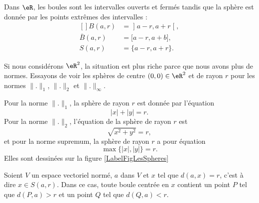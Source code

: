 \begin{example}
	Dans $\eR$, les boules sont  les intervalles ouverts et fermés tandis que la sphère est donnée par les points extrêmes des intervalles :
	\begin{equation}
		\begin{aligned}[]
			B(a,r)&=\mathopen] a-r , a+r \mathclose[,\\
			\bar B(a,r)&=\mathopen[ a-r , a+b \mathclose],\\
			S(a,r)&=\{ a-r,a+r \}.
		\end{aligned}
	\end{equation}
\end{example}

\begin{example}
	Si nous considérons $\eR^2$, la situation est plus riche parce que nous avons plus de normes. Essayons de voir les sphères de centre $(0,0)\in\eR^2$ et de rayon $r$ pour les normes $\| . \|_1$, $\| . \|_2$ et $\| . \|_{\infty}$.

	Pour la norme $\| . \|_1$, la sphère de rayon $r$ est donnée par l'équation
	\begin{equation}
		| x |+| y |=r.
	\end{equation}
	Pour la norme $\| . \|_2$, l'équation de la sphère de rayon $r$ est
	\begin{equation}
		\sqrt{x^2+y^2}=r,
	\end{equation}
	et pour la norme supremum, la sphère de rayon $r$ a pour équation
	\begin{equation}
		\max\{ | x |,| y | \}=r.
	\end{equation}
	Elles sont dessinées sur la figure \ref{LabelFigLesSpheres}
\newcommand{\CaptionFigLesSpheres}{Les sphères de rayon $1$ pour les trois normes classiques.}

\end{example}

\newcommand{\CaptionFigBoulePtLoin}{Le point $P$ est un peu plus loin que $x$, en suivant la même droite.}


\begin{proposition}		\label{PropBoitPtLoin}
	Soient $V$ un espace vectoriel normé, $a$ dans $V$ et $x$ tel que $d(a,x)=r$, c'est à dire $x\in S(a,r)$. Dans ce cas, toute boule centrée en $x$ contient un point $P$ tel que $d(P,a)>r$ et un point $Q$ tel que $d(Q,a)<r$.
\end{proposition}

